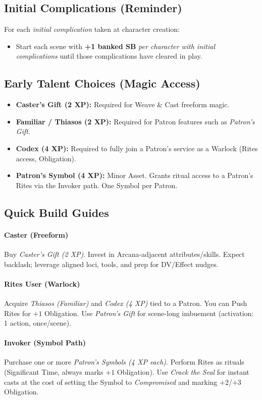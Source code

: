 \subsection{Initial Complications (Reminder)}
For each \emph{initial complication} taken at character creation:
\begin{itemize}
  \item Start each scene with \textbf{+1 banked SB} \emph{per character with initial complications} until those complications have cleared in play.
\end{itemize}

\subsection{Early Talent Choices (Magic Access)}
\begin{itemize}
  \item \textbf{Caster’s Gift (2 XP):} Required for Weave \& Cast freeform magic.
  \item \textbf{Familiar / Thiasos (2 XP):} Required for Patron features such as \emph{Patron’s Gift}.
  \item \textbf{Codex (4 XP):} Required to fully join a Patron’s service as a Warlock (Rites access, Obligation).
  \item \textbf{Patron’s Symbol (4 XP):} Minor Asset. Grants ritual access to a Patron’s Rites via the Invoker path. One Symbol per Patron.
\end{itemize}

\subsection{Quick Build Guides}
\paragraph{Caster (Freeform)}
Buy \emph{Caster’s Gift (2 XP)}. Invest in Arcana-adjacent attributes/skills. Expect backlash; leverage aligned loci, tools, and prep for DV/Effect nudges.

\paragraph{Rites User (Warlock)}
Acquire \emph{Thiasos (Familiar)} and \emph{Codex (4 XP)} tied to a Patron. You can Push Rites for $+1$ Obligation. Use \emph{Patron’s Gift} for scene-long imbuement (activation: 1 action, once/scene).

\paragraph{Invoker (Symbol Path)}
Purchase one or more \emph{Patron’s Symbols (4 XP each)}. Perform Rites as rituals (Significant Time, always marks $+1$ Obligation). Use \emph{Crack the Seal} for instant casts at the cost of setting the Symbol to \emph{Compromised} and marking $+2$/$+3$ Obligation.

